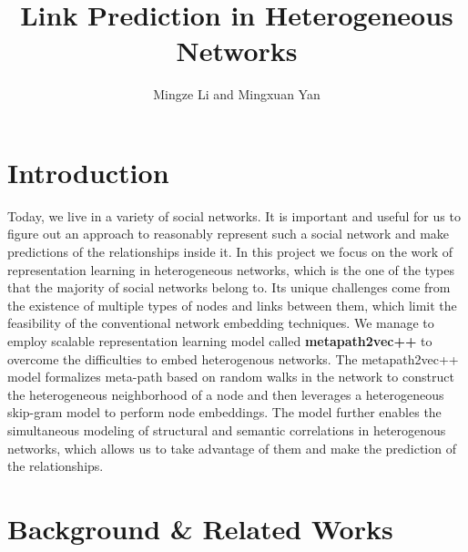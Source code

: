 \documentclass{acmtog} %
\begin{document}

\title{Link Prediction in Heterogeneous Networks} %

\author{Mingze Li {\upshape and} Mingxuan Yan
}

\maketitle
\section{Introduction}
Today, we live in a variety of social networks. It is important and useful for us to figure out an approach to reasonably represent such a social network and make predictions of the relationships inside it. In this project we focus on the work of representation learning in heterogeneous networks, which is the one of the types that the majority of social networks belong to. Its unique challenges come from the existence of multiple types of nodes and links between them, which limit the feasibility of the conventional network embedding techniques. We manage to employ scalable representation learning model called \textbf{metapath2vec++} to overcome the difficulties to embed heterogenous networks. The metapath2vec++ model formalizes meta-path based on random walks in the network to construct the heterogeneous neighborhood of a node and then leverages a heterogeneous skip-gram model to perform node embeddings. The model further enables the simultaneous modeling of structural and semantic correlations in heterogenous networks, which allows us to take advantage of them and make the prediction of the relationships.

\section{Background \& Related Works}
\end{document}
